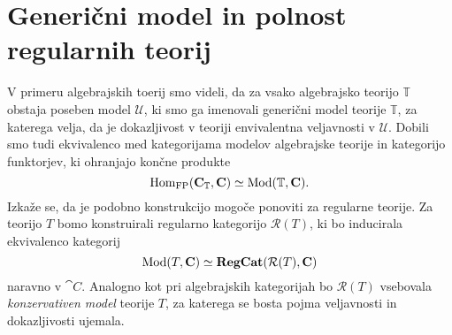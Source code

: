 \documentclass[../kategoricna_logika.tex]{subfiles}
\begin{document}
\section{Generični model in polnost regularnih teorij}
V primeru algebrajskih toerij smo videli, da za vsako algebrajsko teorijo $\mathbb{T}$ obstaja poseben model $\mathcal{U}$,
ki smo ga imenovali generični model teorije $\mathbb{T}$, za katerega velja, da je dokazljivost v teoriji envivalentna veljavnosti v $\mathcal{U}$.
Dobili smo tudi ekvivalenco med kategorijama modelov algebrajske teorije in kategorijo funktorjev, ki ohranjajo končne produkte
$$\operatorname{Hom}_{\mathrm{FP}}({\operatorname{\mathbf{C}}}_{\mathbb{T}}, {\operatorname{\mathbf{C}}}) \simeq \operatorname{Mod}(\mathbb{T}, {\operatorname{\mathbf{C}}}).$$
Izkaže se, da je podobno konstrukcijo mogoče ponoviti za regularne teorije.
Za teorijo $T$ bomo konstruirali regularno kategorijo $\mathcal{R}(T)$, ki bo inducirala ekvivalenco kategorij
$$\operatorname{Mod}(T, {\operatorname{\mathbf{C}}}) \simeq {\operatorname{\mathbf{RegCat}}}(\mathcal{R}(T), {\operatorname{\mathbf{C}}})$$
naravno v $\cat{C}$. Analogno kot pri algebrajskih kategorijah bo $\mathcal{R}(T)$ vsebovala \emph{konzervativen model} teorije $T$,
za katerega se bosta pojma veljavnosti in dokazljivosti ujemala.
\end{document}

